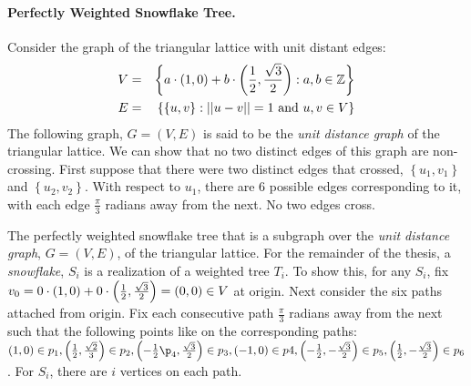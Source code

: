 \paragraph{Perfectly Weighted Snowflake Tree.}

Consider the graph of the triangular lattice with unit distant edges:
\begin{eqnarray*}
V &=& \left\lbrace a\cdot (1,0) + b \cdot \left(\frac{1}{2},\frac{\sqrt{3}}{2}\right) : a,b \in {\mathbb{Z}} \right\rbrace\\
E &=& \left\lbrace \left\lbrace u,v \right\rbrace : \vert\vert u-v \vert\vert = 1 \text{ and } u,v \in V\right\rbrace
\end{eqnarray*}
The following graph, $G=(V,E)$ is said to be the \textit{unit distance graph} of the triangular lattice.  
We can show that no two distinct edges of this graph are non-crossing.  
First suppose that there were two distinct edges that crossed, $\left\lbrace u_1,v_1 \right\rbrace $ and $\left\lbrace u_2,v_2 \right\rbrace$.  
With respect to $u_1$, there are 6 possible edges corresponding to it, with each edge $\frac{\pi}{3}$ radians away from the next.  
No two edges cross.


The perfectly weighted snowflake tree that is a subgraph over the \textit{unit distance graph}, $G=(V,E)$, of the triangular lattice.  
For the remainder of the thesis, a \textit{snowflake}, $S_i$ is a realization of a weighted tree $T_i$.  
To show this, for any $S_i$, fix $v_0 = 0 \cdot (1,0) + 0 \cdot \left(\frac{1}{2},\frac{\sqrt{3}}{2}\right)=\left( 0,0 \right) \in V$ at origin.  
Next consider the six paths attached from origin.  
Fix each consecutive path $\frac{\pi}{3}$ radians away from the next such that the following points like on the corresponding paths: $\lr{1,0} \in p_1, \lr{\frac{1}{2} ,\frac{\sqrt{2}}{3}} \in p_2,\lr{-\frac{1}{2}\p_4,\frac{\sqrt{3}}{2}} \in p_3, \lr{-1,0} \in p4, \lr{-\frac{1}{2},-\frac{\sqrt{3}}{2}}\in p_5,\lr{\frac{1}{2},-\frac{\sqrt{3}}{2}}\in p_6$.  
For $S_i$, there are $i$ vertices on each path.  


